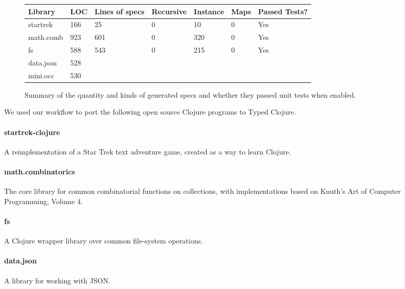 \begin{figure*}
\begin{tabular}
{|         l   || l   | l || l  | l  | l || l |}
  Library       & LOC  &  Lines of specs  & Recursive & Instance & Maps & Passed Tests?\\ 
  \hline
  \hline
  startrek      & 166  &  25  & 0  & 10   & 0  & Yes\\
  math.comb     & 923  &  601 & 0  & 320  & 0  & Yes\\
  fs            & 588  &  543 & 0  & 215  & 0  & Yes\\
  data.json     & 528  \\
  mini.occ      & 530  \\
\end{tabular}
  \caption{Summary of the quantity and kinds of generated specs and whether they passed
  unit tests when enabled.
  }
\label{infer:fig:genspec}
\end{figure*}

\label{infer:sec:experiment2}

We used our workflow to port the following open source Clojure programs to Typed Clojure.

\paragraph{startrek-clojure}
A reimplementation of a Star Trek text adventure game,
created as a way to learn Clojure.

\paragraph{math.combinatorics}
The core library for common combinatorial functions
on collections,
with implementations based on Knuth's Art of Computer
Programming, Volume 4.

\paragraph{fs}
A Clojure wrapper library over common file-system operations.

\paragraph{data.json}
A library for working with JSON.

